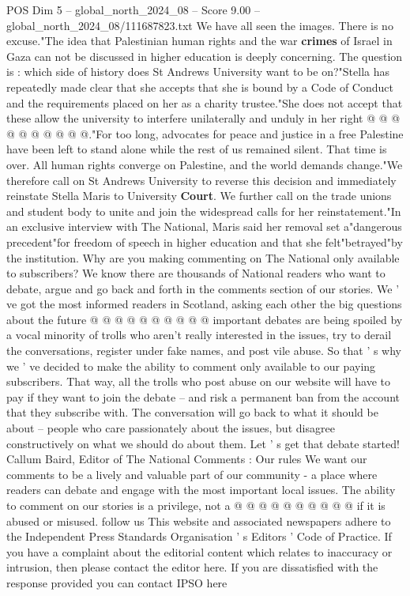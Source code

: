 \begin{textsample}{POS Dim 5 – global\_north\_2024\_08 – Score 9.00 – global\_north\_2024\_08/111687823.txt}
We have all seen the images.
There is no excuse."The idea that Palestinian human rights and the war \textbf{crimes} of Israel in Gaza can not be discussed in higher education is deeply concerning.
The question is : which side of history does St Andrews University want to be on?"Stella has repeatedly made clear that she accepts that she is bound by a Code of Conduct and the requirements placed on her as a charity trustee."She does not accept that these allow the university to interfere unilaterally and unduly in her right @ @ @ @ @ @ @ @ @ @."For too long, advocates for peace and justice in a free Palestine have been left to stand alone while the rest of us remained silent.
That time is over.
All human rights converge on Palestine, and the world demands change."We therefore call on St Andrews University to reverse this decision and immediately reinstate Stella Maris to University \textbf{Court}.
We further call on the trade unions and student body to unite and join the widespread calls for her reinstatement."In an exclusive interview with The National, Maris said her removal set a"dangerous precedent"for freedom of speech in higher education and that she felt"betrayed"by the institution.
Why are you making commenting on The National only available to subscribers?
We know there are thousands of National readers who want to debate, argue and go back and forth in the comments section of our stories.
We ' ve got the most informed readers in Scotland, asking each other the big questions about the future @ @ @ @ @ @ @ @ @ @ important debates are being spoiled by a vocal minority of trolls who aren't really interested in the issues, try to derail the conversations, register under fake names, and post vile abuse.
So that ' s why we ' ve decided to make the ability to comment only available to our paying subscribers.
That way, all the trolls who post abuse on our website will have to pay if they want to join the debate -- and risk a permanent ban from the account that they subscribe with.
The conversation will go back to what it should be about -- people who care passionately about the issues, but disagree constructively on what we should do about them.
Let ' s get that debate started!
Callum Baird, Editor of The National Comments : Our rules We want our comments to be a lively and valuable part of our community - a place where readers can debate and engage with the most important local issues.
The ability to comment on our stories is a privilege, not a @ @ @ @ @ @ @ @ @ @ if it is abused or misused. follow us This website and associated newspapers adhere to the Independent Press Standards Organisation ' s Editors ' Code of Practice.
If you have a complaint about the editorial content which relates to inaccuracy or intrusion, then please contact the editor here.
If you are dissatisfied with the response provided you can contact IPSO here

\end{textsample}
